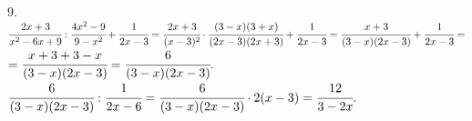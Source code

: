 9. $\cfrac{2x+3}{x^2-6x+9}:\cfrac{4x^2-9}{9-x^2}+\cfrac{1}{2x-3}=
\cfrac{2x+3}{(x-3)^2}\cdot\cfrac{(3-x)(3+x)}{(2x-3)(2x+3)}+\cfrac{1}{2x-3}=
\cfrac{x+3}{(3-x)(2x-3)}+\cfrac{1}{2x-3}=$\\$=\cfrac{x+3+3-x}{(3-x)(2x-3)}=\cfrac{6}{(3-x)(2x-3)}.$\\
$\cfrac{6}{(3-x)(2x-3)}:\cfrac{1}{2x-6}=\cfrac{6}{(3-x)(2x-3)}\cdot2(x-3)=\cfrac{12}{3-2x}.$\\
